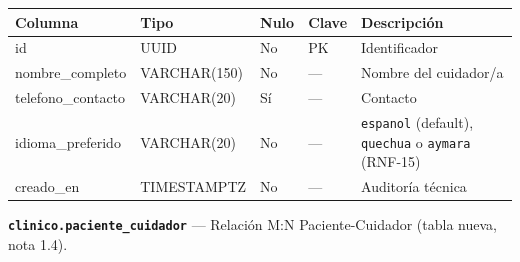 \documentclass[11pt,a4paper]{article}
\begin{document}
{\small
\begin{longtable}[]{@{}
  >{\raggedright\arraybackslash}p{}
  >{\raggedright\arraybackslash}p{}
  >{\raggedright\arraybackslash}p{}
  >{\raggedright\arraybackslash}p{}
  >{\raggedright\arraybackslash}p{}@{}}
\toprule\noalign{}
\begin{minipage}[b]{\linewidth}\raggedright
Columna
\end{minipage} & \begin{minipage}[b]{\linewidth}\raggedright
Tipo
\end{minipage} & \begin{minipage}[b]{\linewidth}\raggedright
Nulo
\end{minipage} & \begin{minipage}[b]{\linewidth}\raggedright
Clave
\end{minipage} & \begin{minipage}[b]{\linewidth}\raggedright
Descripción
\end{minipage} \\
\midrule\noalign{}
\endhead
\bottomrule\noalign{}
\endlastfoot
id & UUID & No & PK & Identificador \\
nombre\_completo & VARCHAR(150) & No & --- & Nombre del cuidador/a \\
telefono\_contacto & VARCHAR(20) & Sí & --- & Contacto \\
idioma\_preferido & VARCHAR(20) & No & --- & \texttt{espanol} (default), \texttt{quechua} o \texttt{aymara} (RNF-15) \\
creado\_en & TIMESTAMPTZ & No & --- & Auditoría técnica \\
\end{longtable}
}

\textbf{\texttt{clinico.paciente\_cuidador}} --- Relación M:N Paciente-Cuidador (tabla nueva, nota 1.4).
\end{document}
